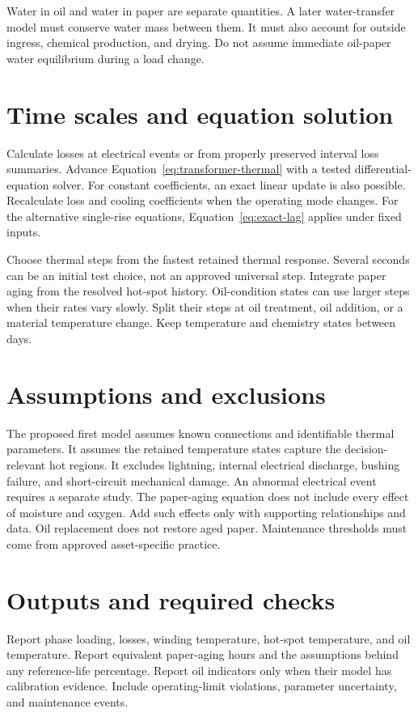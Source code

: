 \documentclass[11pt,a4paper]{report}
\begin{document}
Water in oil and water in paper are separate quantities.
A later water-transfer model must conserve water mass between them.
It must also account for outside ingress, chemical production, and drying.
Do not assume immediate oil-paper water equilibrium during a load change.

\section{Time scales and equation solution}
Calculate losses at electrical events or from properly preserved interval loss summaries.
Advance Equation~\ref{eq:transformer-thermal} with a tested differential-equation solver.
For constant coefficients, an exact linear update is also possible.
Recalculate loss and cooling coefficients when the operating mode changes.
For the alternative single-rise equations, Equation~\ref{eq:exact-lag} applies under fixed inputs.

Choose thermal steps from the fastest retained thermal response.
Several seconds can be an initial test choice, not an approved universal step.
Integrate paper aging from the resolved hot-spot history.
Oil-condition states can use larger steps when their rates vary slowly.
Split their steps at oil treatment, oil addition, or a material temperature change.
Keep temperature and chemistry states between days.

\section{Assumptions and exclusions}
The proposed first model assumes known connections and identifiable thermal parameters.
It assumes the retained temperature states capture the decision-relevant hot regions.
It excludes lightning, internal electrical discharge, bushing failure, and short-circuit mechanical damage.
An abnormal electrical event requires a separate study.
The paper-aging equation does not include every effect of moisture and oxygen.
Add such effects only with supporting relationships and data.
Oil replacement does not restore aged paper.
Maintenance thresholds must come from approved asset-specific practice.

\section{Outputs and required checks}
Report phase loading, losses, winding temperature, hot-spot temperature, and oil temperature.
Report equivalent paper-aging hours and the assumptions behind any reference-life percentage.
Report oil indicators only when their model has calibration evidence.
Include operating-limit violations, parameter uncertainty, and maintenance events.
\end{document}
